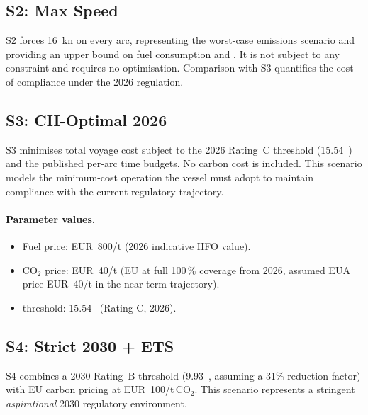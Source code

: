 \subsection{S2: Max Speed}
\label{sec:scen:s2}

S2 forces 16~kn on every arc, representing the worst-case emissions
scenario and providing an upper bound on fuel consumption and \CII{}. It
is not subject to any \CII{} constraint and requires no optimisation.
Comparison with S3 quantifies the cost of \CII{} compliance under the
2026 regulation.

\subsection{S3: CII-Optimal 2026}
\label{sec:scen:s3}

S3 minimises total voyage cost subject to the 2026 Rating~C \CII{}
threshold (15.54~\gGTnm{}) and the published per-arc time budgets. No
\ETS{} carbon cost is included. This scenario models the minimum-cost
operation the vessel must adopt to maintain compliance with the current
regulatory trajectory.

\paragraph{Parameter values.}
\begin{itemize}
  \item Fuel price: EUR~800/t (2026 indicative HFO value).
  \item CO$_2$ price: EUR~40/t (EU \ETS{} at full 100\,\% coverage from 2026,
        assumed EUA price EUR~40/t in the near-term trajectory).
  \item \CII{} threshold: 15.54~\gGTnm{} (Rating C, 2026).
\end{itemize}

\subsection{S4: Strict 2030 + ETS}
\label{sec:scen:s4}

S4 combines a 2030 Rating~B \CII{} threshold (9.93~\gGTnm{}, assuming
a 31\% reduction factor) with EU \ETS{} carbon pricing at
EUR~100/t\,CO$_2$. This scenario represents a stringent
\textit{aspirational} 2030 regulatory environment.

